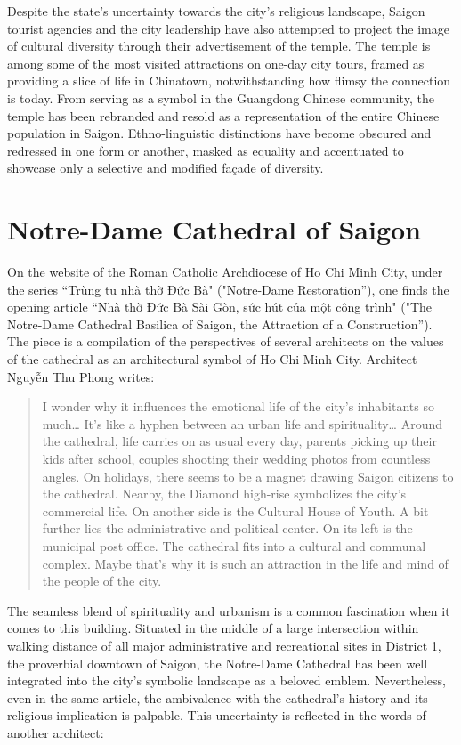 Despite the state's uncertainty towards the city's religious landscape, Saigon tourist agencies and the city leadership have also attempted to project the image of cultural diversity through their advertisement of the temple. The temple is among some of the most visited attractions on one-day city tours, framed as providing a slice of life in Chinatown, notwithstanding how flimsy the connection is today.  From serving as a symbol in the Guangdong Chinese community, the temple has been rebranded and resold as a representation of the entire Chinese population in Saigon. Ethno-linguistic distinctions have become obscured and redressed in one form or another,  masked as equality and accentuated to showcase only a selective and modified façade of diversity.

\section{Notre-Dame Cathedral of Saigon}

On the website of the Roman Catholic Archdiocese of Ho Chi Minh City, under the series  “Trùng tu nhà thờ Đức Bà" ("Notre-Dame Restoration”), one finds the opening article “Nhà thờ Đức Bà Sài Gòn, sức hút của một công trình" ("The Notre-Dame Cathedral Basilica of Saigon, the Attraction of a Construction”). The piece is a compilation of the perspectives of several architects on the values of the cathedral as an architectural symbol of Ho Chi Minh City. Architect Nguyễn Thu Phong writes:

\begin{quotation}
I wonder why it influences the emotional life of the city’s inhabitants so much… It’s like a hyphen between an urban life and spirituality… Around the cathedral, life carries on as usual every day, parents picking up their kids after school, couples shooting their wedding photos from countless angles. On holidays, there seems to be a magnet drawing Saigon citizens to the cathedral. Nearby, the Diamond high-rise symbolizes the city’s commercial life. On another side is the Cultural House of Youth. A bit further lies the administrative and political center. On its left is the municipal post office. The cathedral fits into a cultural and communal complex. Maybe that’s why it is such an attraction in the life and mind of the people of the city.
\end{quotation}

The seamless blend of spirituality and urbanism is a common fascination when it comes to this building. Situated in the middle of a large intersection within walking distance of all major administrative and recreational sites in District 1, the proverbial downtown of Saigon, the Notre-Dame Cathedral has been well integrated into the city’s symbolic landscape as a beloved emblem. Nevertheless, even in the same article, the ambivalence with the cathedral’s history and its religious implication is palpable. This uncertainty is reflected in the words of another architect:

